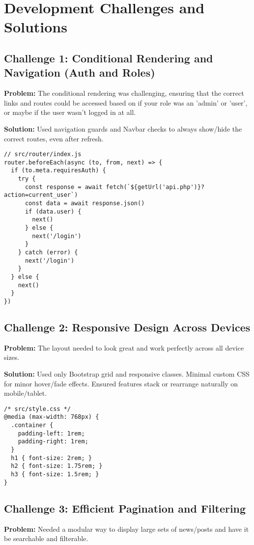 \documentclass[11pt,a4paper]{article}
\begin{document}
\section*{Development Challenges and Solutions}

\subsection*{Challenge 1: Conditional Rendering and Navigation (Auth and Roles)}
\textbf{Problem:} The conditional rendering was challenging, ensuring that the correct links and routes could be accessed based on if your role was an 'admin' or 'user', or maybe if the user wasn't logged in at all.

\textbf{Solution:} Used navigation guards and Navbar checks to always show/hide the correct routes, even after refresh.

\begin{verbatim}
// src/router/index.js
router.beforeEach(async (to, from, next) => {
  if (to.meta.requiresAuth) {
    try {
      const response = await fetch(`${getUrl('api.php')}?action=current_user`)
      const data = await response.json()
      if (data.user) {
        next()
      } else {
        next('/login')
      }
    } catch (error) {
      next('/login')
    }
  } else {
    next()
  }
})
\end{verbatim}

\subsection*{Challenge 2: Responsive Design Across Devices}
\textbf{Problem:} The layout needed to look great and work perfectly across all device sizes.

\textbf{Solution:} Used only Bootstrap grid and responsive classes. Minimal custom CSS for minor hover/fade effects. Ensured features stack or rearrange naturally on mobile/tablet.

\begin{verbatim}
/* src/style.css */
@media (max-width: 768px) {
  .container {
    padding-left: 1rem;
    padding-right: 1rem;
  }
  h1 { font-size: 2rem; }
  h2 { font-size: 1.75rem; }
  h3 { font-size: 1.5rem; }
}
\end{verbatim}

\subsection*{Challenge 3: Efficient Pagination and Filtering}
\textbf{Problem:} Needed a modular way to display large sets of news/posts and have it be searchable and filterable.
\end{document}
